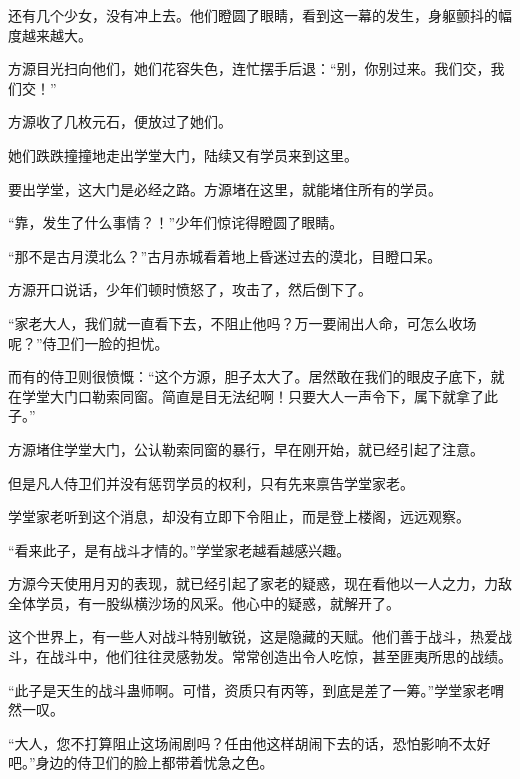 \begin{this_body}
还有几个少女，没有冲上去。他们瞪圆了眼睛，看到这一幕的发生，身躯颤抖的幅度越来越大。

方源目光扫向他们，她们花容失色，连忙摆手后退：“别，你别过来。我们交，我们交！”

方源收了几枚元石，便放过了她们。

她们跌跌撞撞地走出学堂大门，陆续又有学员来到这里。

要出学堂，这大门是必经之路。方源堵在这里，就能堵住所有的学员。

“靠，发生了什么事情？！”少年们惊诧得瞪圆了眼睛。

“那不是古月漠北么？”古月赤城看着地上昏迷过去的漠北，目瞪口呆。

方源开口说话，少年们顿时愤怒了，攻击了，然后倒下了。

“家老大人，我们就一直看下去，不阻止他吗？万一要闹出人命，可怎么收场呢？”侍卫们一脸的担忧。

而有的侍卫则很愤慨：“这个方源，胆子太大了。居然敢在我们的眼皮子底下，就在学堂大门口勒索同窗。简直是目无法纪啊！只要大人一声令下，属下就拿了此子。”

方源堵住学堂大门，公认勒索同窗的暴行，早在刚开始，就已经引起了注意。

但是凡人侍卫们并没有惩罚学员的权利，只有先来禀告学堂家老。

学堂家老听到这个消息，却没有立即下令阻止，而是登上楼阁，远远观察。

“看来此子，是有战斗才情的。”学堂家老越看越感兴趣。

方源今天使用月刃的表现，就已经引起了家老的疑惑，现在看他以一人之力，力敌全体学员，有一股纵横沙场的风采。他心中的疑惑，就解开了。

这个世界上，有一些人对战斗特别敏锐，这是隐藏的天赋。他们善于战斗，热爱战斗，在战斗中，他们往往灵感勃发。常常创造出令人吃惊，甚至匪夷所思的战绩。

“此子是天生的战斗蛊师啊。可惜，资质只有丙等，到底是差了一筹。”学堂家老喟然一叹。

“大人，您不打算阻止这场闹剧吗？任由他这样胡闹下去的话，恐怕影响不太好吧。”身边的侍卫们的脸上都带着忧急之色。

\end{this_body}

